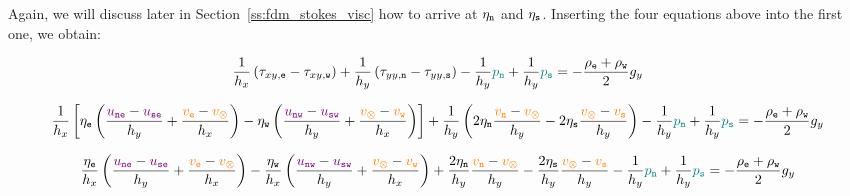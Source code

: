 Again, we will discuss later in Section~\ref{ss:fdm_stokes_visc} how to arrive at 
$\eta_{\tt n}$ and $\eta_{\tt s}$.
Inserting the four equations above into the first one, we obtain:



\[
\frac{1}{h_x} \left(\tau_{xy,{\tt e}}-\tau_{xy,{\tt w}}\right) + 
\frac{1}{h_y} \left(\tau_{yy,{\tt n}}-\tau_{yy,{\tt s}}\right)
-\frac{1}{h_y} {\color{teal}p_{\tt n}} + \frac{1}{h_y} {\color{teal}p_{\tt s}}
= -\frac{\rho_{\tt e}+\rho_{\tt w}}{2} g_y
\]



{\footnotesize
\[
\frac{1}{h_x} \left[
\eta_{\tt e} \left( \frac{{\color{violet} u_{\tt ne}}-{\color{violet} u_{\tt se}}}{h_y} 
+\frac{{\color{orange} v_{\tt e}}-{\color{orange} v_\otimes}}{h_x} \right) 
-
\eta_{\tt w} \left( \frac{{\color{violet} u_{\tt nw}}-{\color{violet} u_{\tt sw}}}{h_y} 
+\frac{{\color{orange} v_\otimes} - {\color{orange} v_{\tt w}}}{h_x} \right) 
\right] 
+
\frac{1}{h_y} \left(
2\eta_{\tt n} \frac{{\color{orange} v_{\tt n}}-{\color{orange} v_\otimes}}{h_y} 
-
2\eta_{\tt s} \frac{{\color{orange} v_\otimes} -{\color{orange} v_{\tt s}}}{h_y}
\right)
-\frac{1}{h_y} {\color{teal}p_{\tt n}} + \frac{1}{h_y} {\color{teal}p_{\tt s}}
= -\frac{\rho_{\tt e}+\rho_{\tt w}}{2} g_y
\]
}





{\footnotesize
\[
\frac{\eta_{\tt e}}{h_x} 
 \left( \frac{{\color{violet} u_{\tt ne}}-{\color{violet} u_{\tt se}}}{h_y} 
+\frac{{\color{orange} v_{\tt e}}-{\color{orange} v_\otimes}}{h_x} \right) 
-
\frac{\eta_{\tt w}}{h_x} \left( \frac{{\color{violet} u_{\tt nw}}-{\color{violet} u_{\tt sw}}}{h_y} 
+\frac{{\color{orange} v_\otimes} - {\color{orange} v_{\tt w}}}{h_x} \right) 
+
\frac{2\eta_{\tt n}}{h_y} 
 \frac{{\color{orange} v_{\tt n}}-{\color{orange} v_\otimes}}{h_y} 
-
\frac{2\eta_{\tt s}}{h_y}   \frac{{\color{orange} v_\otimes} -{\color{orange} v_{\tt s}}}{h_y}
-\frac{1}{h_y} {\color{teal}p_{\tt n}} + \frac{1}{h_y} {\color{teal}p_{\tt s}}
= -\frac{\rho_{\tt e}+\rho_{\tt w}}{2} g_y
\]
}

